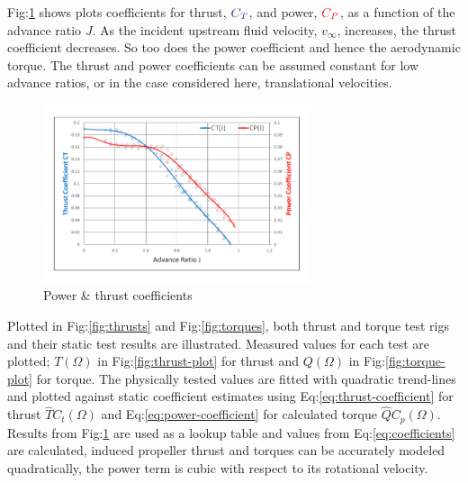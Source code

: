 Fig:\ref{fig:coeffs-plot} shows plots coefficients for thrust, {$\color{Blue}C_{T}$}, and power, {$\color{Red}C_{P}$}, as a function of the advance ratio $J$. As the incident upstream fluid velocity, $v_\infty$, increases, the thrust coefficient decreases. So too does the power coefficient and hence the aerodynamic torque. The thrust and power coefficients can be assumed constant for low advance ratios, or in the case considered here, translational velocities.
\begin{figure}[htpb]
\vspace{-12pt}
\centering
\includegraphics[width=0.7\textwidth]{graphs/coeffs-plot}
\vspace{-12pt}
\caption{Power \& thrust coefficients}
\vspace{-16pt}
\label{fig:coeffs-plot}
\end{figure}
\par
Plotted in Fig:\ref{fig:thrusts} and Fig:\ref{fig:torques}, both thrust and torque test rigs and their static test results are illustrated. Measured values for each test are plotted; {\color{Red}$T(\Omega)$} in Fig:\ref{fig:thrust-plot} for thrust and {\color{Red}$Q(\Omega)$} in Fig:\ref{fig:torque-plot} for torque. The physically tested values are fitted with quadratic trend-lines and plotted against static coefficient estimates using Eq:\ref{eq:thrust-coefficient} for thrust {\color{LimeGreen}$\hat{T}C_t(\Omega)$} and Eq:\ref{eq:power-coefficient} for calculated torque {\color{LimeGreen}$\hat{Q}C_p(\Omega)$}. Results from Fig:\ref{fig:coeffs-plot} are used as a lookup table and values from Eq:\ref{eq:coefficients} are calculated, induced propeller thrust and torques can be accurately modeled quadratically, the power term is cubic with respect to its rotational velocity. 
